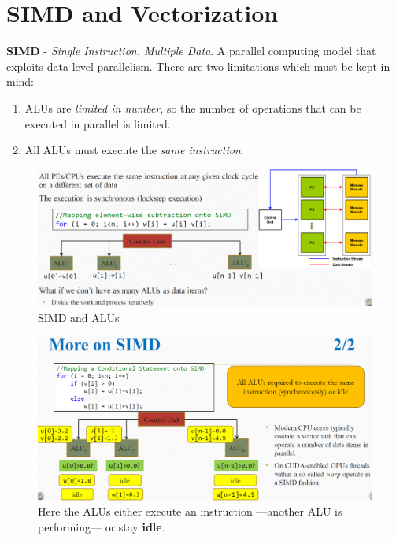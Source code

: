 \newpage
\section{SIMD and Vectorization}
\textbf{SIMD} - \textit{Single Instruction, Multiple Data}. A parallel computing model that exploits data-level parallelism.
There are two limitations which must be kept in mind:
\begin{enumerate}
   \item ALUs are \textit{limited in number}, so the number of operations that can be executed in parallel is limited.
   \item All ALUs must execute the \textit{same instruction}.
\end{enumerate}

\begin{figure}[htbp]
   \centering
   \includegraphics{images/04/SIMD.png}
   \caption{SIMD and ALUs}
   \label{fig:04/SIMD}
\end{figure}

\begin{figure}[htbp]
   \centering
   \includegraphics{images/04/SIMD2.png}
   \caption{Here the ALUs either execute an instruction ---another ALU is performing--- or stay \textbf{idle}.}
   \label{fig:04/SIMD2}
\end{figure}

